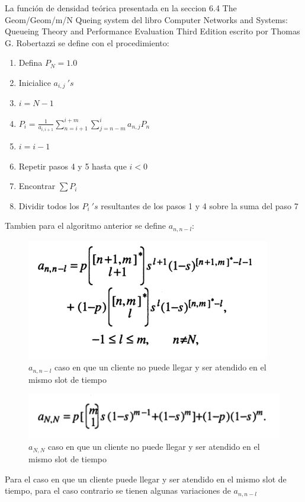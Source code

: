 \documentclass{article}
\begin{document}
La función de densidad teórica presentada en la seccion 6.4 The Geom/Geom/m/N Queing system del libro Computer Networks and Systems: Queueing Theory and Performance Evaluation Third Edition escrito por Thomas G. Robertazzi se define con el procedimiento:

\begin{enumerate}
    \item Defina $P_N = 1.0$
    \item Inicialice $a_{i,j}\ 's$
    \item $i = N-1$
    \item $	P_i=\frac{1}{a_{i,i+1}}\sum_{n=i+1}^{i+m}\sum_{j=n-m}^{i}{a_{n,j}P_n}$
    \item $i=i-1$
    \item Repetir pasos 4 y 5 hasta que $i<0$
    \item Encontrar $\sum {P_i}$
    \item Dividir todos los $P_i\ 's$ resultantes de los pasos 1 y 4 sobre la suma del paso 7
\end{enumerate}

Tambien para el algoritmo anterior se define $a_{n,n-l}$:
\begin{figure}[H]
    \centering
    \includegraphics[width=0.5\linewidth]{images/imageGeoGeoMCalc1.png}
    \caption{$a_{n,n-l}$ caso en que un cliente no puede llegar y ser atendido en el mismo slot de tiempo}
    \label{fig:enter-label}
\end{figure}

\begin{figure} [H]
    \centering
    \includegraphics[width=0.5\linewidth]{images/imageGeoGeoMCalc2.png}
    \caption{$a_{N,N}$ caso en que un cliente no puede llegar y ser atendido en el mismo slot de tiempo}
    \label{fig:enter-label}
\end{figure}

Para el caso en que un cliente puede llegar y ser atendido en el mismo slot de tiempo, para el caso contrario se tienen algunas variaciones de $a_{n,n-l}$
\end{document}
